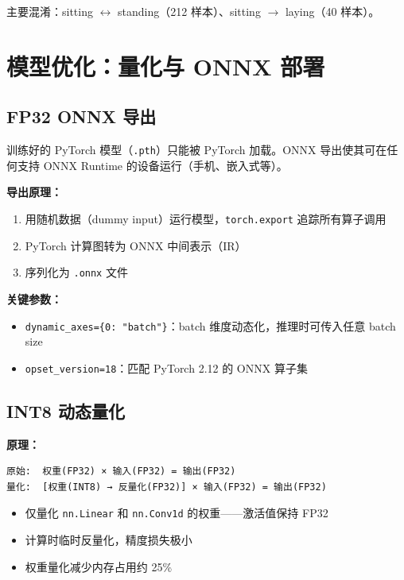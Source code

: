 \documentclass[12pt,a4paper]{ctexart}
\newcommand{\file}[1]{\texttt{#1}}
\newcommand{\code}[1]{\texttt{#1}}
\begin{document}
主要混淆：sitting $\leftrightarrow$ standing（212 样本）、sitting $\rightarrow$ laying（40 样本）。

\section{模型优化：量化与 ONNX 部署}

\subsection{FP32 ONNX 导出}

训练好的 PyTorch 模型（\file{.pth}）只能被 PyTorch 加载。ONNX 导出使其可在任何支持 ONNX Runtime 的设备运行（手机、嵌入式等）。

\textbf{导出原理：}
\begin{enumerate}
    \item 用随机数据（dummy input）运行模型，\code{torch.export} 追踪所有算子调用
    \item PyTorch 计算图转为 ONNX 中间表示（IR）
    \item 序列化为 \file{.onnx} 文件
\end{enumerate}

\textbf{关键参数：}
\begin{itemize}
    \item \texttt{dynamic\_axes=\{0: "batch"\}}：batch 维度动态化，推理时可传入任意 batch size
    \item \code{opset\_version=18}：匹配 PyTorch 2.12 的 ONNX 算子集
\end{itemize}

\subsection{INT8 动态量化}

\textbf{原理：}
\begin{verbatim}
原始:  权重(FP32) × 输入(FP32) = 输出(FP32)
量化:  [权重(INT8) → 反量化(FP32)] × 输入(FP32) = 输出(FP32)
\end{verbatim}

\begin{itemize}
    \item 仅量化 \code{nn.Linear} 和 \code{nn.Conv1d} 的权重——激活值保持 FP32
    \item 计算时临时反量化，精度损失极小
    \item 权重量化减少内存占用约 25\%
\end{itemize}
\end{document}
